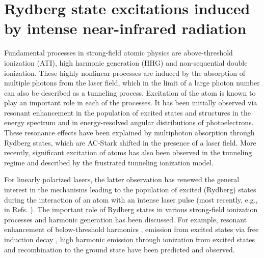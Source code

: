 \chapter{Rydberg state excitations induced by intense near-infrared radiation} %
\label{cha:rydberg_state_excitations}

Fundamental processes in strong-field atomic physics are above-threshold ionization (ATI), high harmonic generation (HHG) and non-sequential double ionization. These highly nonlinear processes are induced by the absorption of multiple photons from the laser field, which in the limit of a large photon number can also be described as a tunneling process. Excitation of the atom is known to play an important role in each of the processes. It has been initially observed via resonant enhancement in the population of excited states \cite{deboer1992,jones1992} and structures in the energy spectrum \cite{freeman1987,perry1989,agostini1989} and in energy-resolved angular distributions \cite{rottke1994} of photoelectrons. These resonance effects have been explained by multiphoton absorption through Rydberg states, which are AC-Stark shifted in the presence of a laser field. More recently, significant excitation of atoms has also been observed in the tunneling regime and described by the frustrated tunneling ionization model. 

For linearly polarized lasers, the latter observation has renewed the general interest in the mechanisms leading to the population of excited (Rydberg) states during the interaction of an atom with an intense laser pulse (most recently, e.g., in Refs. \cite{chini2014,li2014,li2014b,zimmermann2015,shao2015,camp2015,li2015,fechner2015,bredtmann2016,fushitani2016,lv2016,serebryannikov2016,hart2016,li2016,xiong2016,beaulieu2016,larimian2016,zimmermann2017,bengtsson2017,gao2017,ivanov2017,ilchen2017,mancuso2017,xiong2017,piraux2017}). The important role of Rydberg states in various strong-field ionization processes and harmonic generation has been discussed. For example, resonant enhancement of below-threshold harmonics \cite{toma1999,chini2014,camp2015}, emission from excited states via free induction decay \cite{camp2015,beaulieu2016}, high harmonic emission through ionization from excited states and recombination to the ground state \cite{bian2010,beaulieu2016} have been predicted and observed.


